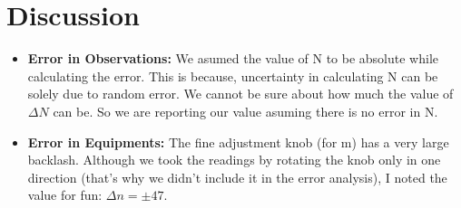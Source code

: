 \section{Discussion}

	\begin{itemize}
		\item \textbf{Error in Observations:} We asumed the value of N to be absolute while calculating the error. This is because, uncertainty in calculating N can be solely due to random error. We cannot be sure about how much the value of $\Delta N$ can be. So we are reporting our value asuming there is no error in N.
		\item \textbf{Error in Equipments:} The fine adjustment knob (for m) has a very large backlash. Although we took the readings by rotating the knob only in one direction (that's why we didn't include it in the error analysis), I noted the value for fun: $\Delta n = \pm 47$.
	\end{itemize}